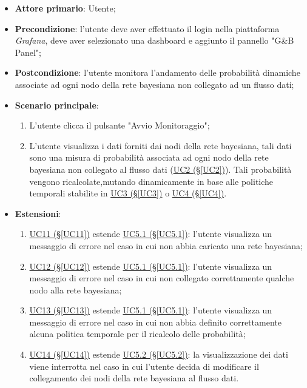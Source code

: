 \begin{itemize}
\item \textbf{Attore primario}: Utente;
\item \textbf{Precondizione}: l'utente deve aver effettuato il login nella piattaforma \textit{Grafana}, deve aver selezionato una dashboard e aggiunto il pannello "G\&B Panel";
\item \textbf{Postcondizione}: l'utente monitora l'andamento delle probabilità dinamiche associate ad ogni nodo della rete bayesiana non collegato ad un flusso dati;
\item \textbf{Scenario principale}: 
	\begin{enumerate}
	\item L'utente clicca il pulsante "Avvio Monitoraggio";
	\item L'utente visualizza i dati forniti dai nodi della rete bayesiana, tali dati sono una misura di probabilità 			associata ad ogni nodo della rete bayesiana non collegato al flusso dati (\hyperref[UC2]{UC2 (§\ref*{UC2})}). 				Tali probabilità vengono ricalcolate,mutando dinamicamente in base alle politiche temporali stabilite in 						\hyperref[UC3]{UC3 (§\ref*{UC3})} o \hyperref[UC4]{UC4 (§\ref*{UC4})}.
	\end{enumerate}
\item \textbf{Estensioni}:
	\begin{enumerate}
	\item \hyperref[UC11]{UC11 (§\ref*{UC11})} estende \hyperref[UC5.1]{UC5.1 (§\ref*{UC5.1})}: l'utente visualizza un messaggio di errore nel caso in cui non abbia caricato una rete bayesiana;
	\item \hyperref[UC12]{UC12 (§\ref*{UC12})} estende \hyperref[UC5.1]{UC5.1 (§\ref*{UC5.1})}: l'utente visualizza un messaggio di errore nel caso in cui non collegato correttamente qualche nodo alla rete bayesiana;
	\item \hyperref[UC13]{UC13 (§\ref*{UC13})} estende \hyperref[UC5.1]{UC5.1 (§\ref*{UC5.1})}: l'utente visualizza un messaggio di errore nel caso in cui non abbia definito correttamente alcuna politica temporale per il ricalcolo delle probabilità;
	\item \hyperref[UC14]{UC14 (§\ref*{UC14})} estende \hyperref[UC5.2]{UC5.2 (§\ref*{UC5.2})}: la visualizzazione dei dati viene interrotta nel caso in cui l'utente decida di modificare il collegamento dei nodi della rete bayesiana al flusso dati.
	\end{enumerate}
\end{itemize}

